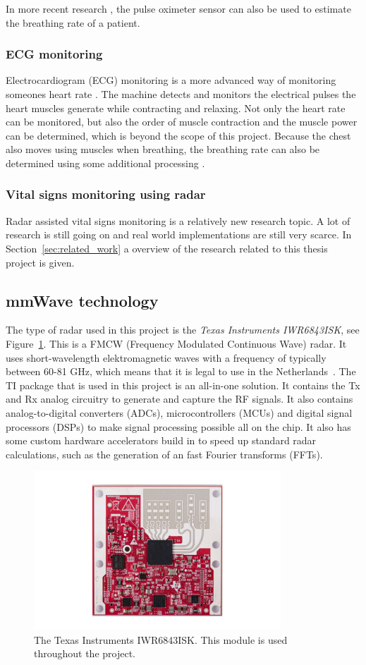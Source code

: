 In more recent research \cite{motin2019selection}, the pulse oximeter sensor can also be used to estimate the breathing rate of a patient. 

\subsubsection{ECG monitoring}
Electrocardiogram (ECG) monitoring is a more advanced way of monitoring someones heart rate \cite{berkaya2018survey}. The machine detects and monitors the electrical pulses the heart muscles generate while contracting and relaxing. Not only the heart rate can be monitored, but also the order of muscle contraction and the muscle power can be determined, which is beyond the scope of this project. Because the chest also moves using muscles when breathing, the breathing rate can also be determined using some additional processing \cite{charlton2017breathing}.

\subsubsection{Vital signs monitoring using radar}
Radar assisted vital signs monitoring is a relatively new research topic. A lot of research is still going on and real world implementations are still very scarce. In Section~\ref{sec:related_work} a overview of the research related to this thesis project is given.  

\subsection{mmWave technology}
\label{sec:mmwave_tech}
The type of radar used in this project is the \emph{Texas Instruments IWR6843ISK}, see Figure~\ref{fig:iwr6843isk}. This is a FMCW (Frequency Modulated Continuous Wave) radar. It uses short-wavelength elektromagnetic waves with a frequency of typically between 60-81 GHz, which means that it is legal to use in the Netherlands~\cite{freq_plan}. The TI package that is used in this project is an all-in-one solution. It contains the Tx and Rx analog circuitry to generate and capture the RF signals. It also contains analog-to-digital converters (ADCs), microcontrollers (MCUs) and digital signal processors (DSPs) to make signal processing possible all on the chip. It also has some custom hardware accelerators build in to speed up standard radar calculations, such as the generation of an fast Fourier transforms (FFTs).

\begin{figure}[t]
\centering
\includegraphics[width=.5\textwidth]{figures/iwr6843isk.jpg}
\caption{The Texas Instruments IWR6843ISK. This module is used throughout the project.}
\label{fig:iwr6843isk}
\end{figure}

